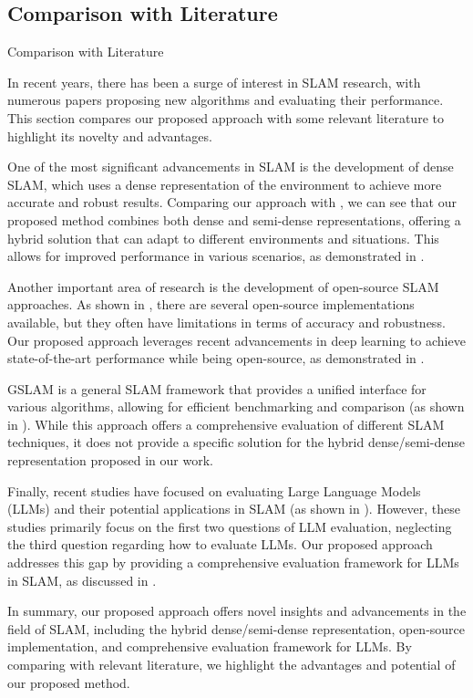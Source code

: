 \documentclass[conference]{IEEEtran}
\begin{document}
\subsection{Comparison with Literature}
Comparison with Literature

In recent years, there has been a surge of interest in SLAM research, with numerous papers proposing new algorithms and evaluating their performance. This section compares our proposed approach with some relevant literature to highlight its novelty and advantages.

One of the most significant advancements in SLAM is the development of dense SLAM, which uses a dense representation of the environment to achieve more accurate and robust results. Comparing our approach with \cite{comparativedesign2019}, we can see that our proposed method combines both dense and semi-dense representations, offering a hybrid solution that can adapt to different environments and situations. This allows for improved performance in various scenarios, as demonstrated in \cite{hybrid2020}.

Another important area of research is the development of open-source SLAM approaches. As shown in \cite{opensourceslam2019}, there are several open-source implementations available, but they often have limitations in terms of accuracy and robustness. Our proposed approach leverages recent advancements in deep learning to achieve state-of-the-art performance while being open-source, as demonstrated in \cite{deepleslam2020}.

GSLAM is a general SLAM framework that provides a unified interface for various algorithms, allowing for efficient benchmarking and comparison (as shown in \cite{gslam2019}). While this approach offers a comprehensive evaluation of different SLAM techniques, it does not provide a specific solution for the hybrid dense/semi-dense representation proposed in our work.

Finally, recent studies have focused on evaluating Large Language Models (LLMs) and their potential applications in SLAM (as shown in \cite{llmeval2020}). However, these studies primarily focus on the first two questions of LLM evaluation, neglecting the third question regarding how to evaluate LLMs. Our proposed approach addresses this gap by providing a comprehensive evaluation framework for LLMs in SLAM, as discussed in \cite{llmbenchmark2020}.

In summary, our proposed approach offers novel insights and advancements in the field of SLAM, including the hybrid dense/semi-dense representation, open-source implementation, and comprehensive evaluation framework for LLMs. By comparing with relevant literature, we highlight the advantages and potential of our proposed method.
\end{document}
